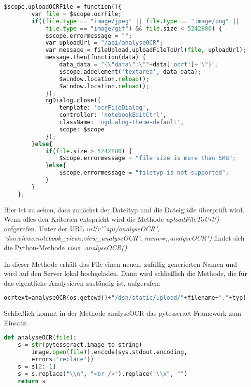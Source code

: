 \begin{lstlisting}[caption={Upload OCR-File}, language=Python]
$scope.uploadOCRFile = function(){
        var file = $scope.ocrFile;
        if((file.type == "image/jpeg" || file.type == "image/png" ||
        	file.type == "image/gif") && file.size < 5242880) {
            $scope.errormessage = "";
            var uploadUrl = "/api/analyseOCR";
            var message = fileUpload.uploadFileToUrl(file, uploadUrl);
            message.then(function(data) {
                data_data = "{\"data\":\""+data['ocrt']+"\"}";
                $scope.addelement('textarea', data_data);
                $window.location.reload();
                $window.location.reload();
            });
            ngDialog.close({
                template: 'ocrFileDialog',
                controller: 'notebookEditCtrl',
                className: 'ngdialog-theme-default',
                scope: $scope
            });
        }else{
            if(file.size > 5242880) {
                $scope.errormessage = "file size is more than 5MB";
            }else{
                $scope.errormessage = "filetyp is not supported";
            }
        }
    };
\end{lstlisting}

Hier ist zu sehen, dass zunächst der Dateityp und die Dateigröße überprüft wird. Wenn alles den Kriterien entspricht wird die Methode \textit{uploadFileToUrl()} aufgerufen. Unter der URL \textit{url(r'\^{}api/analyseOCR', 'dsn.views.notebook\_views.view\_analyseOCR', name=,,analyseOCR")} findet sich die Python-Methode \textit{view\_analyseOCR()}.

\newpage

In dieser Methode erhält das File einen neuen, zufällig generierten Namen und wird auf den Server lokal hochgeladen. Dann wird schließlich die Methode, die für das eigentliche Analysieren zuständig ist, aufgerufen:

\begin{lstlisting}[caption={OCR-Analyse}, language=Python]
ocrtext=analyseOCR(os.getcwd()+"/dsn/static/upload/"+filename+"."+typ)
\end{lstlisting}

Schließlich kommt in der Methode analyseOCR das pytesseract-Framework zum Einsatz:

\begin{lstlisting}[caption={analyseOCR mittels pytesseract}, language=Python]
def analyseOCR(file):
	s = str(pytesseract.image_to_string(
		Image.open(file)).encode(sys.stdout.encoding,
		errors='replace'))
    s = s[2:-1]
    s = s.replace("\\n", "<br />").replace("\\x", "")
    return s
\end{lstlisting}


